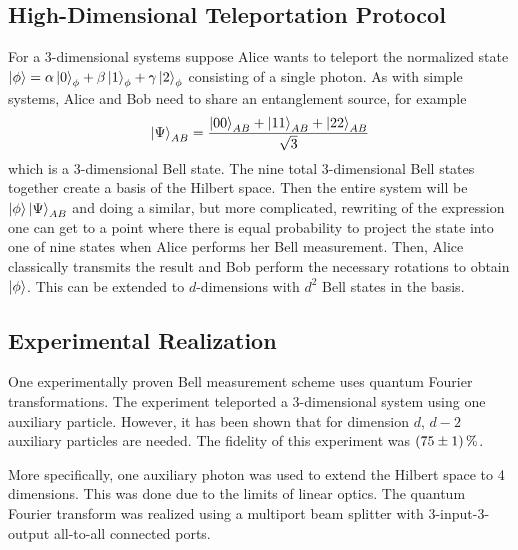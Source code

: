 \subsection{High-Dimensional Teleportation Protocol}
For a 3-dimensional systems suppose Alice wants to teleport the normalized state $\ket{\phi} = \alpha \ket{0}_\phi + \beta \ket{1}_\phi + \gamma \ket{2}_\phi$ consisting of a single photon. As with simple systems, Alice and Bob need to share an entanglement source, for example 
\begin{equation}
    \ket{\Psi}_{AB} = \frac{\ket{00}_{AB} + \ket{11}_{AB} + \ket{22}_{AB}}{\sqrt{3}}
\end{equation}
which is a 3-dimensional Bell state. The nine total 3-dimensional Bell states together create a basis of the Hilbert space. Then the entire system will be $\ket{\phi}\ket{\Psi}_{AB}$ and doing a similar, but more complicated, rewriting of the expression one can get to a point where there is equal probability to project the state into one of nine states when Alice performs her Bell measurement. Then, Alice classically transmits the result and Bob perform the necessary rotations to obtain $\ket{\phi}$. This can be extended to $d$-dimensions with $d^2$ Bell states in the basis. \cite{Luo:2019}

\subsection{Experimental Realization}
One experimentally proven Bell measurement scheme uses quantum Fourier transformations. The experiment teleported a 3-dimensional system using one auxiliary particle. However, it has been shown that for dimension $d$, $d-2$ auxiliary particles are needed. The fidelity of this experiment was $\SI{75\pm 1}{\percent}$. \cite{Luo:2019}

More specifically, one auxiliary photon was used to extend the Hilbert space to 4 dimensions. This was done due to the limits of linear optics. The quantum Fourier transform was realized using a multiport beam splitter with 3-input-3-output all-to-all connected ports.